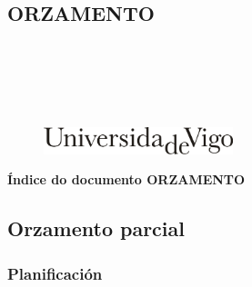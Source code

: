 \documentclass[11pt,twoside]{book}
\begin{document}
\begin{center}
\begin{normalsize}
\begin{center}
\part{\bf{ORZAMENTO}}
\end{center}
\end{normalsize}
\ \\
\ \\
\ \\
\ \\

\begin{center}
\begin{figure}[htbp]
\begin{center}
\includegraphics[angle=0, height=0.8cm]{images/UVIGOLogo.png}
\end{center}
\end{figure}
\end{center}

\end{center}

\cleardoublepage


\pagestyle{fancy}
\startcontents[parts]
\begin{center}{\large \bf Índice do documento ORZAMENTO}\end{center}

{\hypersetup{hidelinks}}

\cleardoublepage




\chapter{Orzamento parcial}

\section{Planificación}
\end{document}
